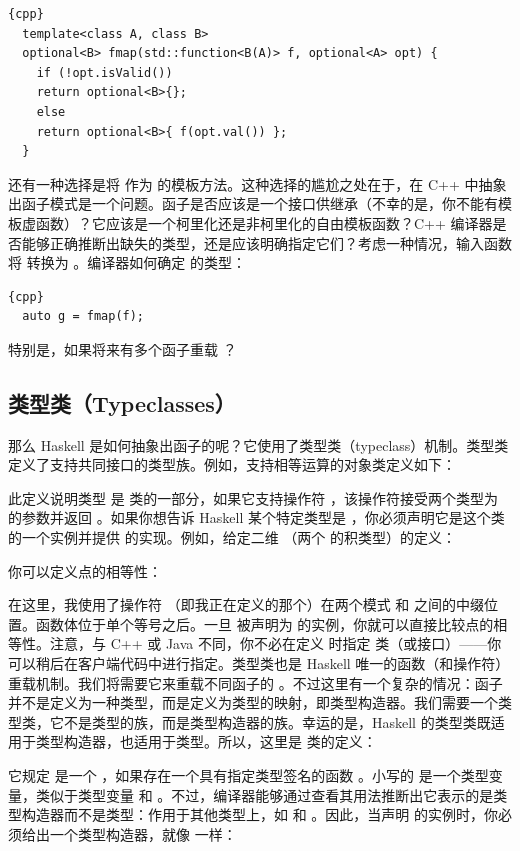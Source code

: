 \begin{lstlisting}{cpp}
  template<class A, class B>
  optional<B> fmap(std::function<B(A)> f, optional<A> opt) {
    if (!opt.isValid())
    return optional<B>{};
    else
    return optional<B>{ f(opt.val()) };
  }
\end{lstlisting}
还有一种选择是将  作为  的模板方法。这种选择的尴尬之处在于，在 C++ 中抽象出函子模式是一个问题。函子是否应该是一个接口供继承（不幸的是，你不能有模板虚函数）？它应该是一个柯里化还是非柯里化的自由模板函数？C++ 编译器是否能够正确推断出缺失的类型，还是应该明确指定它们？考虑一种情况，输入函数  将  转换为 。编译器如何确定  的类型：

\begin{lstlisting}{cpp}
  auto g = fmap(f);
\end{lstlisting}
特别是，如果将来有多个函子重载 ？

\subsection{类型类（Typeclasses）}

那么 Haskell 是如何抽象出函子的呢？它使用了类型类（typeclass）机制。类型类定义了支持共同接口的类型族。例如，支持相等运算的对象类定义如下：

此定义说明类型  是  类的一部分，如果它支持操作符 \code{(==)}，该操作符接受两个类型为  的参数并返回 。如果你想告诉 Haskell 某个特定类型是 ，你必须声明它是这个类的一个实例并提供 \code{(==)} 的实现。例如，给定二维 （两个  的积类型）的定义：

你可以定义点的相等性：

在这里，我使用了操作符 \code{(==)}（即我正在定义的那个）在两个模式  和  之间的中缀位置。函数体位于单个等号之后。一旦  被声明为  的实例，你就可以直接比较点的相等性。注意，与 C++ 或 Java 不同，你不必在定义  时指定  类（或接口）——你可以稍后在客户端代码中进行指定。类型类也是 Haskell 唯一的函数（和操作符）重载机制。我们将需要它来重载不同函子的 。不过这里有一个复杂的情况：函子并不是定义为一种类型，而是定义为类型的映射，即类型构造器。我们需要一个类型类，它不是类型的族，而是类型构造器的族。幸运的是，Haskell 的类型类既适用于类型构造器，也适用于类型。所以，这里是  类的定义：

它规定  是一个 ，如果存在一个具有指定类型签名的函数 。小写的  是一个类型变量，类似于类型变量  和 。不过，编译器能够通过查看其用法推断出它表示的是类型构造器而不是类型：作用于其他类型上，如  和 。因此，当声明  的实例时，你必须给出一个类型构造器，就像  一样：

